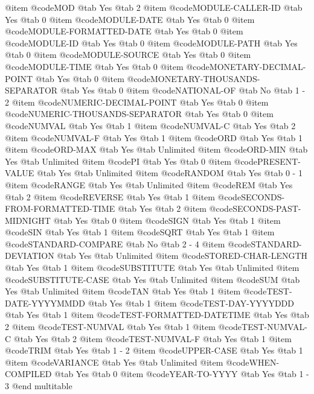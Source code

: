 @item @code{MOD} @tab Yes @tab 2
@item @code{MODULE-CALLER-ID} @tab Yes @tab 0
@item @code{MODULE-DATE} @tab Yes @tab 0
@item @code{MODULE-FORMATTED-DATE} @tab Yes @tab 0
@item @code{MODULE-ID} @tab Yes @tab 0
@item @code{MODULE-PATH} @tab Yes @tab 0
@item @code{MODULE-SOURCE} @tab Yes @tab 0
@item @code{MODULE-TIME} @tab Yes @tab 0
@item @code{MONETARY-DECIMAL-POINT} @tab Yes @tab 0
@item @code{MONETARY-THOUSANDS-SEPARATOR} @tab Yes @tab 0
@item @code{NATIONAL-OF} @tab No @tab 1 - 2
@item @code{NUMERIC-DECIMAL-POINT} @tab Yes @tab 0
@item @code{NUMERIC-THOUSANDS-SEPARATOR} @tab Yes @tab 0
@item @code{NUMVAL} @tab Yes @tab 1
@item @code{NUMVAL-C} @tab Yes @tab 2
@item @code{NUMVAL-F} @tab Yes @tab 1
@item @code{ORD} @tab Yes @tab 1
@item @code{ORD-MAX} @tab Yes @tab Unlimited
@item @code{ORD-MIN} @tab Yes @tab Unlimited
@item @code{PI} @tab Yes @tab 0
@item @code{PRESENT-VALUE} @tab Yes @tab Unlimited
@item @code{RANDOM} @tab Yes @tab 0 - 1
@item @code{RANGE} @tab Yes @tab Unlimited
@item @code{REM} @tab Yes @tab 2
@item @code{REVERSE} @tab Yes @tab 1
@item @code{SECONDS-FROM-FORMATTED-TIME} @tab Yes @tab 2
@item @code{SECONDS-PAST-MIDNIGHT} @tab Yes @tab 0
@item @code{SIGN} @tab Yes @tab 1
@item @code{SIN} @tab Yes @tab 1
@item @code{SQRT} @tab Yes @tab 1
@item @code{STANDARD-COMPARE} @tab No @tab 2 - 4
@item @code{STANDARD-DEVIATION} @tab Yes @tab Unlimited
@item @code{STORED-CHAR-LENGTH} @tab Yes @tab 1
@item @code{SUBSTITUTE} @tab Yes @tab Unlimited
@item @code{SUBSTITUTE-CASE} @tab Yes @tab Unlimited
@item @code{SUM} @tab Yes @tab Unlimited
@item @code{TAN} @tab Yes @tab 1
@item @code{TEST-DATE-YYYYMMDD} @tab Yes @tab 1
@item @code{TEST-DAY-YYYYDDD} @tab Yes @tab 1
@item @code{TEST-FORMATTED-DATETIME} @tab Yes @tab 2
@item @code{TEST-NUMVAL} @tab Yes @tab 1
@item @code{TEST-NUMVAL-C} @tab Yes @tab 2
@item @code{TEST-NUMVAL-F} @tab Yes @tab 1
@item @code{TRIM} @tab Yes @tab 1 - 2
@item @code{UPPER-CASE} @tab Yes @tab 1
@item @code{VARIANCE} @tab Yes @tab Unlimited
@item @code{WHEN-COMPILED} @tab Yes @tab 0
@item @code{YEAR-TO-YYYY} @tab Yes @tab 1 - 3
@end multitable
